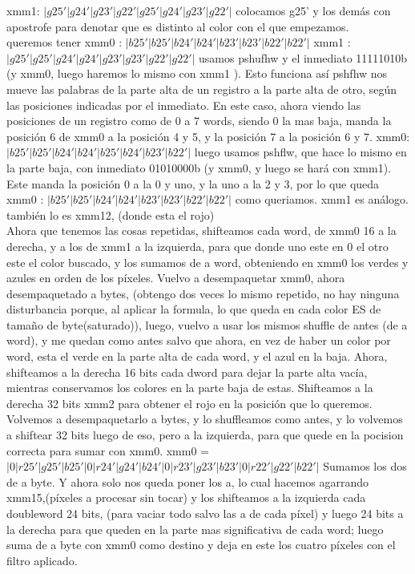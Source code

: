 \documentclass[a4paper]{article}
\begin{document}
\hfill \break
xmm1: $|g25'|g24'|g23'|g22'|g25'|g24'|g23'|g22'|$\hfill \break
 colocamos g25' y los demás con apostrofe  para denotar que es distinto al color con el que empezamos.
\hfill \break
\\
queremos tener 
\hfill \break
 xmm0 : $|b25'|b25'|b24'|b24'|b23'|b23'|b22'|b22'|$
 \hfill \break
 xmm1 : $|g25'|g25'|g24'|g24'|g23'|g23'|g22'|g22'|$
 \hfill \break
usamos pshufhw y el inmediato 11111010b (y xmm0, luego haremos lo mismo con xmm1  ). Esto funciona así pshfhw nos mueve las palabras de la parte alta de un registro a la parte alta de otro, según las posiciones indicadas por el inmediato. En este caso, ahora viendo las posiciones de un registro como de 0 a 7 words, siendo 0 la mas baja,  manda la posición 6 de xmm0 a la posición 4 y 5, 
y la posición 7 a la posición 6 y 7. 
\hfill \break
xmm0:$|b25'|b25'|b24'|b24'|b25'|b24'|b23'|b22'|$
\hfill \break
luego usamos pshflw, que hace lo mismo en la parte baja, con inmediato 01010000b (y xmm0, y luego se hará con xmm1). Este manda la posición 0 a la 0 y uno, y la uno a la 2 y 3, por lo que queda 
\hfill \break
 xmm0 : $|b25'|b25'|b24'|b24'|b23'|b23'|b22'|b22'|$\hfill \break
 como queriamos. xmm1 es análogo. también lo es xmm12, (donde esta el rojo)
 \hfill \break \\
 Ahora que tenemos las cosas repetidas, shifteamos cada word, de xmm0 16 a la derecha, y a los de xmm1 a la izquierda, para que donde uno este en 0 el otro este el color buscado, y los sumamos de a word, obteniendo en xmm0 los verdes y azules en orden de los píxeles.
 \hfill \break
 Vuelvo a desempaquetar xmm0, ahora desempaquetado a bytes, (obtengo dos veces lo mismo repetido, no hay ninguna disturbancia porque, al aplicar la formula, lo que queda en cada color ES de tamaño de  byte(saturado)), luego, vuelvo a usar los mismos shuffle de antes (de a word), y me quedan como antes salvo que ahora, en vez de haber un color por word, esta el verde en la parte alta de cada word, y el azul en la baja. 
 \hfill \break
 Ahora, shifteamos a la derecha 16 bits cada dword para dejar la parte alta vacía, mientras conservamos los colores en la parte baja de estas. Shifteamos a la derecha 32 bits xmm2 para obtener el rojo en la posición que lo queremos. Volvemos a desempaquetarlo a  bytes, y lo shuffleamos como antes, y lo volvemos a shiftear 32 bits luego de eso, pero a la izquierda, para que quede en la pocision correcta para sumar con xmm0.
 \hfill \break
 xmm0 = $|0|r25'|g25'|b25'|0|r24'|g24'|b24'|0|r23'|g23'|b23'|0|r22'|g22'|b22'| $
 \hfill \break
  Sumamos los dos de a byte. Y ahora solo nos queda poner los a, lo cual hacemos agarrando xmm15,(píxeles a procesar sin tocar) y los shifteamos a la izquierda cada doubleword 24 bits, (para vaciar todo salvo las a de cada píxel) y luego 24  bits a la derecha para que queden en la parte mas significativa de cada word; luego suma de a byte con xmm0 como destino y deja en este los cuatro píxeles con el filtro aplicado.
\end{document}

